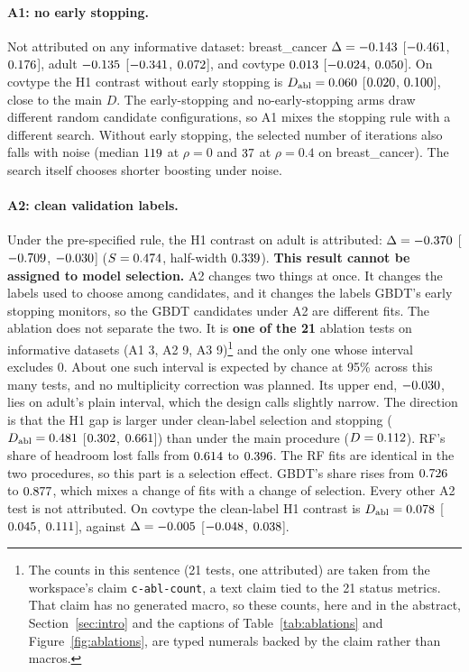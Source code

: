 \documentclass[11pt]{article}
\newcommand{\ds}[1]{\textsf{#1}}
\newcommand{\bc}{\ds{breast\_cancer}}
\newcommand{\ad}{\ds{adult}}
\newcommand{\ct}{\ds{covtype}}
\begin{document}
\paragraph{A1: no early stopping.} Not attributed on any informative dataset: \bc{}
$\Delta = -0.143$ [$-0.461$, $0.176$], \ad{} $-0.135$
[$-0.341$, $0.072$], and \ct{} $0.013$ [$-0.024$,
$0.050$]. On \ct{} the H1 contrast without early stopping is $D_{\mathrm{abl}} =
0.060$ [$0.020$, $0.100$], close to the main $D$. The early-stopping and
no-early-stopping arms draw different random candidate configurations, so A1 mixes the
stopping rule with a different search. Without early stopping, the selected number of
iterations also falls with noise (median $119$ at $\rho=0$ and $37$ at
$\rho=0.4$ on \bc). The search itself chooses shorter boosting under noise.

\paragraph{A2: clean validation labels.} Under the pre-specified rule, the H1 contrast on
\ad{} is attributed: $\Delta = -0.370$ [$-0.709$, $-0.030$]
($S = 0.474$, half-width $0.339$). \textbf{This result cannot be assigned
to model selection.} A2 changes two things at once. It changes the labels used to choose
among candidates, and it changes the labels GBDT's early stopping monitors, so the GBDT
candidates under A2 are different fits. The ablation does not separate the two. It is
\textbf{one of the 21} ablation tests on informative datasets (A1 3, A2 9, A3 9)\footnote{The
counts in this sentence (21 tests, one attributed) are taken from the workspace's claim
\texttt{c-abl-count}, a text claim tied to the 21 status metrics. That claim has no
generated macro, so these counts, here and in the abstract, Section~\ref{sec:intro} and the
captions of Table~\ref{tab:ablations} and Figure~\ref{fig:ablations}, are typed numerals
backed by the claim rather than macros.} and the only
one whose interval excludes 0. About one such interval is expected by chance at 95\% across
this many tests, and no multiplicity correction was planned. Its upper end, $-0.030$,
lies on \ad's plain interval, which the design calls slightly narrow. The direction is that
the H1 gap is larger under clean-label selection and stopping ($D_{\mathrm{abl}} =
0.481$ [$0.302$, $0.661$]) than under the main procedure
($D = 0.112$). RF's share of headroom lost falls from $0.614$ to $0.396$. The RF fits
are identical in the two procedures, so this part is a selection effect. GBDT's share rises
from $0.726$ to $0.877$, which mixes a change of fits with a change of selection. Every
other A2 test is not attributed. On \ct{} the clean-label H1 contrast is $D_{\mathrm{abl}} =
0.078$ [$0.045$, $0.111$], against $\Delta = -0.005$
[$-0.048$, $0.038$].
\end{document}
